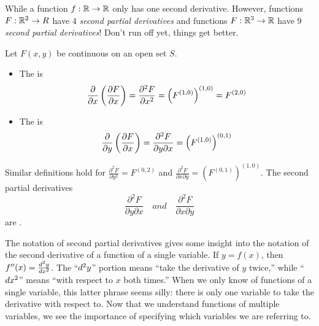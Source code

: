 \documentclass{ximera}
\begin{document}
While a function $f:\R\to\R$ only has one second derivative. However,
functions $F:\R^2\to R$ have $4$ \textit{second partial derivatives}
and functions $F:\R^3\to\R$ have $9$ \textit{second partial
  derivatives}! Don't run off yet, things get better.

\begin{definition}
  Let $F(x,y)$ be continuous on an open set $S$.
  \begin{itemize}
  \item The  is
    \[
    \pp{x}\left(\pp[F]{x}\right) = \frac{\partial^2 F}{\partial x^2} = \left(F^{(1,0)}\right)^{(1,0)}= F^{(2,0)}
    \]
  \item The  is
    \[
    \pp{y}\left(\pp[F]{x}\right) = \frac{\partial^2F}{\partial y\partial x} = \left(F^{(1,0)}\right)^{(0,1)}
    \]

%
\end{itemize}
Similar definitions hold for $\frac{\partial^2F}{\partial y^2} =
F^{(0,2)}$ and $\frac{\partial^2F}{\partial x\partial y} =
\left(F^{(0,1)}\right)^{(1,0)}$. The second partial derivatives
\[
\frac{\partial^2F}{\partial y\partial x} \quad{and}\quad \frac{\partial^2F}{\partial x\partial y}
\]
are .
\end{definition}

The notation of second partial derivatives gives some insight into the
notation of the second derivative of a function of a single
variable. If $y=f(x)$, then $f''(x) = \frac{\d^2 y}{\d x^2}$. The
``$\d^2y$'' portion means ``take the derivative of $y$ twice,'' while
``$\d x^2$'' means ``with respect to $x$ both times.'' When we only know
of functions of a single variable, this latter phrase seems silly:
there is only one variable to take the derivative with respect to. Now
that we understand functions of multiple variables, we see the
importance of specifying which variables we are referring to.
\end{document}
